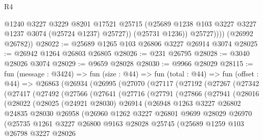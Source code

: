 \begin{lexlean}{R4}
\begin{coremodule}
                  @1240
                  @3227
                  @3229
                  @8201
                  @17521
                  @25715
                  (@25689 @1238 @103 @3227 @3227 @1237 @3074 (@25724 @1237) @25727))
                (@25731 @1236))
              @25727))))
      (@26992 @26782))
@28022 := @25689 @1265 @103 @26806 @3227 @26914 @3074
@28025 := @26942 @1264 @26803 @26805
@28026 := @231 @26795
@28028 := @3040 @28026 @3074
@28029 := @9659 @28028
@28030 := @9966 @28029
@28115 := fun (message : @3424) =>
  fun (size : @44) =>
  fun (total : @44) =>
  fun (offset : @44) =>
  @26863
    (@26934
      (@26995
        (@27070
          (@27117
            (@27192
              (@27267
                (@27342
                  (@27417
                    (@27492
                      (@27566
                        (@27641
                          (@27716
                            (@27791
                              (@27866
                                (@27941
                                  (@28016
                                    (@28022
                                      (@28025
                                        (@24921 @28030)
                                        @26914
                                        (@26948
                                          @1263
                                          @3227
                                          @26802
                                          @24835
                                          @28030
                                          @26958
                                          (@26960
                                            @1262
                                            @3227
                                            @26801
                                            @9699
                                            @28029
                                            @26970
                                            (@25735
                                              @1261
                                              @3227
                                              @26800
                                              @9163
                                              @28028
                                              @25745
                                              (@25689
                                                @1259
                                                @103
                                                @26798
                                                @3227
                                                @28026

\end{coremodule}
\end{lexlean}
